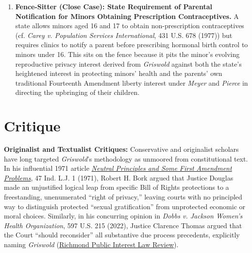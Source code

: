 \documentclass[12pt]{article}
\begin{document}
\begin{enumerate}
    \item \textbf{Fence-Sitter (Close Case): State Requirement of Parental Notification for Minors Obtaining Prescription Contraceptives.} A state allows minors aged 16 and 17 to obtain non-prescription contraceptives (cf. \textit{Carey v. Population Services International}, 431 U.S. 678 (1977)) but requires clinics to notify a parent before prescribing hormonal birth control to minors under 16. This sits on the fence because it pits the minor's evolving reproductive privacy interest derived from \textit{Griswold} against both the state's heightened interest in protecting minors' health and the parents' own traditional Fourteenth Amendment liberty interest under \textit{Meyer} and \textit{Pierce} in directing the upbringing of their children.
\end{enumerate}

\section{Critique}
\textbf{Originalist and Textualist Critiques:} Conservative and originalist scholars have long targeted \textit{Griswold}'s methodology as unmoored from constitutional text. In his influential 1971 article \href{https://scispace.com/pdf/neutral-principles-and-some-first-amendment-problems-euvfezrxrs.pdf}{\textit{Neutral Principles and Some First Amendment Problems}}, 47 Ind. L.J. 1 (1971), Robert H. Bork argued that Justice Douglas made an unjustified logical leap from specific Bill of Rights protections to a freestanding, unenumerated ``right of privacy,'' leaving courts with no principled way to distinguish protected ``sexual gratification'' from unprotected economic or moral choices. Similarly, in his concurring opinion in \textit{Dobbs v. Jackson Women's Health Organization}, 597 U.S. 215 (2022), Justice Clarence Thomas argued that the Court ``should reconsider'' all substantive due process precedents, explicitly naming \textit{Griswold} (\href{https://scholarship.richmond.edu/cgi/viewcontent.cgi?article=1607&context=pilr}{Richmond Public Interest Law Review}).
\end{document}
